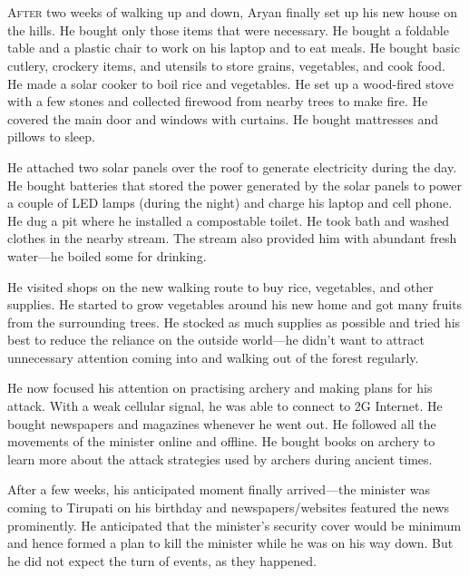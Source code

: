 \chapter{}

\lettrine{A}{fter} two weeks of walking up and down, Aryan finally set up his new house on
the hills. He bought only those items that were necessary. He bought a foldable
table and a plastic chair to work on his laptop and to eat meals. He bought
basic cutlery, crockery items, and utensils to store grains, vegetables, and
cook food. He made a solar cooker to boil rice and vegetables. He set up a
wood-fired stove with a few stones and collected firewood from nearby trees to
make fire. He covered the main door and windows with curtains. He bought
mattresses and pillows to sleep.

He attached two solar panels over the roof to generate electricity during the
day. He bought batteries that stored the power generated by the solar panels to
power a couple of LED lamps (during the night) and charge his laptop and cell
phone. He dug a pit where he installed a compostable toilet. He took bath and
washed clothes in the nearby stream. The stream also provided him with abundant
fresh water—he boiled some for drinking.

He visited shops on the new walking route to buy rice, vegetables, and other
supplies. He started to grow vegetables around his new home and got many fruits
from the surrounding trees. He stocked as much supplies as possible and tried his
best to reduce the reliance on the outside world—he didn't want to attract
unnecessary attention coming into and walking out of the forest regularly.

He now focused his attention on practising archery and making plans for his
attack. With a weak cellular signal, he was able to connect to 2G Internet. He
bought newspapers and magazines whenever he went out. He followed all the
movements of the minister online and offline. He bought books on archery to
learn more about the attack strategies used by archers during ancient times.

After a few weeks, his anticipated moment finally arrived—the minister was
coming to Tirupati on his birthday and newspapers/websites featured the news
prominently. He anticipated that the minister's security cover would be minimum
and hence formed a plan to kill the minister while he was on his way down. But
he did not expect the turn of events, as they happened.